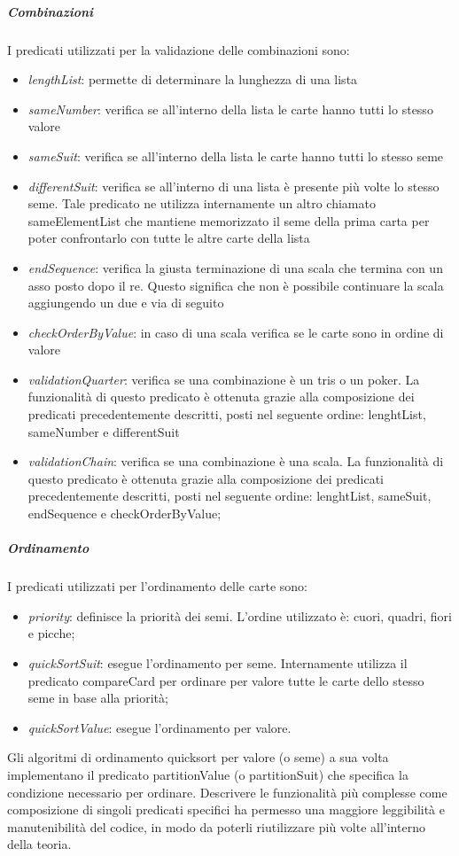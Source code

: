 \subparagraph{Combinazioni} I predicati utilizzati per la validazione delle combinazioni sono:
\begin{itemize}
    \item \textit{lengthList}: permette di determinare la lunghezza di una lista
    \item \textit{sameNumber}: verifica se all’interno della lista le carte hanno tutti lo stesso valore
    \item \textit{sameSuit}: verifica se all’interno della lista le carte hanno tutti lo stesso seme
    \item \textit{differentSuit}: verifica se all’interno di una lista è presente più volte lo stesso seme.
    Tale predicato ne utilizza internamente un altro chiamato sameElementList che mantiene memorizzato il seme della prima carta per poter confrontarlo con tutte le altre carte della lista
    \item \textit{endSequence}: verifica la giusta terminazione di una scala che termina con un asso posto dopo il re.
    Questo significa che non è possibile continuare la scala aggiungendo un due e via di seguito
    \item \textit{checkOrderByValue}: in caso di una scala verifica se le carte sono in ordine di valore
    \item \textit{validationQuarter}: verifica se una combinazione è un tris o un poker.
    La funzionalità di questo predicato è ottenuta grazie alla composizione dei predicati precedentemente descritti, posti nel seguente ordine: lenghtList, sameNumber e differentSuit
    \item \textit{validationChain}: verifica se una combinazione è una scala.
    La funzionalità di questo predicato è ottenuta grazie alla composizione dei predicati precedentemente descritti, posti nel seguente ordine: lenghtList, sameSuit, endSequence e checkOrderByValue;
\end{itemize}

\subparagraph{Ordinamento}
I predicati utilizzati per l’ordinamento delle carte sono:
\begin{itemize}
    \item \textit{priority}: definisce la priorità dei semi.
    L’ordine utilizzato è: cuori, quadri, fiori e picche;
    \item \textit{quickSortSuit}: esegue l’ordinamento per seme.
    Internamente utilizza il predicato compareCard per ordinare per valore tutte le carte dello stesso seme in base alla priorità;
    \item \textit{quickSortValue}: esegue l’ordinamento per valore.
\end{itemize}
Gli algoritmi di ordinamento quicksort per valore (o seme) a sua volta implementano il predicato partitionValue (o partitionSuit) che specifica la condizione necessario per ordinare.
\newline
Descrivere le funzionalità più complesse come composizione di singoli predicati specifici ha permesso una maggiore leggibilità e manutenibilità del codice, in modo da poterli riutilizzare più volte all’interno della teoria.

